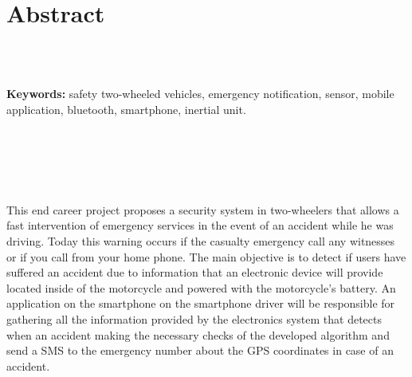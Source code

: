 	\chapter*{Abstract} %
	
	
	\
	\\
	\
	
	\textbf{Keywords:} safety two-wheeled vehicles, emergency notification, sensor, mobile application, bluetooth, smartphone, inertial unit.
	
	\
	\\
	\\
	\\
	\
	
	
	
	This end career project proposes a security system in two-wheelers that allows a fast intervention of emergency services in the event of an accident while he was driving. Today this warning occurs if the casualty emergency call any witnesses or if you call from your home phone. The main objective is to detect if users have suffered an accident due to information that an electronic device will provide located inside of the motorcycle and powered with the motorcycle's battery. An application on the smartphone on the smartphone driver will be responsible for gathering all the information provided by the electronics system that detects when an accident making the necessary checks of the developed algorithm and send a SMS to the emergency number about the GPS coordinates in case of an accident.
	
	
	
	
	
	\newpage
	$\ $